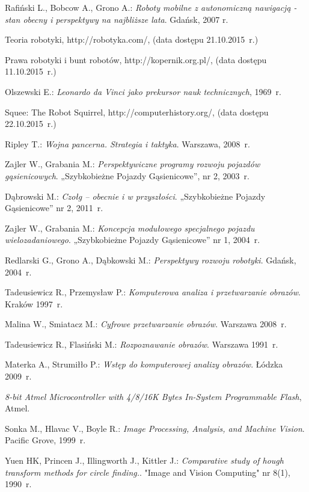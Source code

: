 \begin{thebibliography}{9}

Rafiński L., Bobcow A., Grono A.: \emph{Roboty mobilne z autonomiczną nawigacją - stan obecny i perspektywy na najbliższe lata}. Gdańsk, 2007 r.  

Teoria robotyki, http://robotyka.com/, (data dostępu 21.10.2015~r.)

Prawa robotyki i bunt robotów, http://kopernik.org.pl/, (data dostępu 11.10.2015~r.)

Olszewski E.: \emph{Leonardo da Vinci jako prekursor nauk technicznych}, 1969~r.

Squee: The Robot Squirrel, http://computerhistory.org/, (data dostępu 22.10.2015~r.)

Ripley T.: \emph{Wojna pancerna. Strategia i taktyka}. Warszawa, 2008~r.

Zajler W., Grabania M.: \emph{Perspektywiczne programy rozwoju pojazdów gąsienicowych}. „Szybkobieżne Pojazdy Gąsienicowe”, nr 2, 2003~r.

Dąbrowski M.: \emph{Czołg – obecnie i w przyszłości}. „Szybkobieżne Pojazdy Gąsienicowe” nr 2, 2011~r.

Zajler W., Grabania M.: \emph{Koncepcja modułowego specjalnego pojazdu wielozadaniowego}. „Szybkobieżne Pojazdy Gąsienicowe” nr 1, 2004~r.

Redlarski G., Grono A., Dąbkowski M.: \emph{Perspektywy rozwoju robotyki}. Gdańsk, 2004~r.

Tadeusiewicz R., Przemysław P.: \emph{Komputerowa analiza i przetwarzanie obrazów}. Kraków 1997~r.

Malina W., Smiatacz M.: \emph{Cyfrowe przetwarzanie obrazów}. Warszawa 2008~r.

Tadeusiewicz R., Flasiński M.: \emph{Rozpoznawanie obrazów}. Warszawa 1991~r.

Materka A., Strumiłło P.: \emph{Wstęp do komputerowej analizy obrazów}. Łódzka 2009~r.

\emph{8-bit Atmel Microcontroller with 4/8/16K Bytes In-System Programmable Flash}, Atmel.

Sonka M., Hlavac V., Boyle R.: \emph{Image Processing, Analysis, and Machine Vision}. Pacific Grove, 1999~r.

Yuen HK, Princen J., Illingworth J., Kittler J.: \emph{Comparative study of hough transform methods for circle finding.}. "Image and Vision Computing" nr 8(1), 1990~r.

\end{thebibliography}
